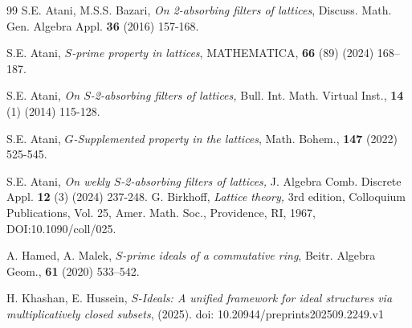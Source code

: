\documentclass[preprint,review,10pt]{amsart}
\theoremstyle{definition}
\theoremstyle{remark}
\numberwithin{equation}{section}
\begin{document}
\begin{thebibliography}{99}
S.E. Atani, M.S.S. Bazari, {\it On 2-absorbing ﬁlters of lattices}, Discuss. Math. Gen. Algebra Appl. {\bf 36} (2016) 157-168.

S.E.  Atani, {\it $S$-prime property in lattices}, MATHEMATICA, {\bf 66} (89) (2024)  168–187.

S.E.  Atani, {\it On $S$-2-absorbing filters of lattices,} Bull. Int. Math. Virtual Inst., {\bf 14} (1) (2014) 115-128.

S.E. Atani, {\it $G$-Supplemented property in the lattices}, Math. Bohem., {\bf 147} (2022) 525-545.

S.E. Atani, {\it On wekly $S$-2-absorbing filters of lattices,} J. Algebra Comb. Discrete Appl. {\bf 12} (3) (2024) 237-248.
G. Birkhoff, {\it Lattice theory,} 3rd edition, Colloquium Publications, Vol. 25, Amer. Math. Soc., Providence, RI, 1967, DOI:10.1090/coll/025.

A. Hamed, A. Malek, {\it $S$-prime ideals of a commutative ring}, Beitr. Algebra Geom., {\bf 61} (2020) 533–542.

H. Khashan, E. Hussein, {\it $S$-Ideals: A unified framework for ideal structures via multiplicatively closed subsets}, (2025). doi: 10.20944/preprints202509.2249.v1

\end{thebibliography}
\end{document}
